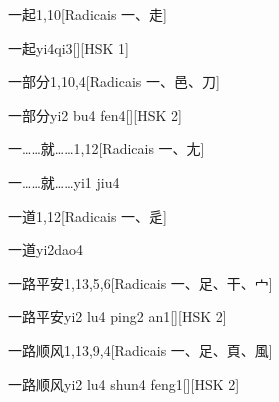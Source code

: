 \begin{entry}{一起}{1,10}[Radicais ⼀、⾛]
  \begin{phonetics}{一起}{yi4qi3}[][HSK 1]
  \end{phonetics}
\end{entry}

\begin{entry}{一部分}{1,10,4}[Radicais ⼀、⾢、⼑]
  \begin{phonetics}{一部分}{yi2 bu4 fen4}[][HSK 2]
  \end{phonetics}
\end{entry}

\begin{entry}{一……就……}{1,12}[Radicais ⼀、⼪]
  \begin{phonetics}{一……就……}{yi1 jiu4}
  \end{phonetics}
\end{entry}

\begin{entry}{一道}{1,12}[Radicais ⼀、⾡]
  \begin{phonetics}{一道}{yi2dao4}
  \end{phonetics}
\end{entry}

\begin{entry}{一路平安}{1,13,5,6}[Radicais ⼀、⾜、⼲、⼧]
  \begin{phonetics}{一路平安}{yi2 lu4 ping2 an1}[][HSK 2]
  \end{phonetics}
\end{entry}

\begin{entry}{一路顺风}{1,13,9,4}[Radicais ⼀、⾜、⾴、⾵]
  \begin{phonetics}{一路顺风}{yi2 lu4 shun4 feng1}[][HSK 2]
  \end{phonetics}
\end{entry}


